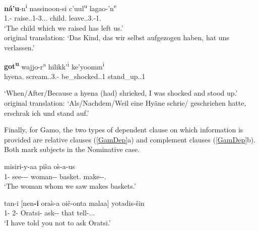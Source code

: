 \begin{exe}\ex\label{KabDep}
\begin{xlist}
\ex\gll \textbf{n\'a'u}-n\textsuperscript{i} nassinoon-si c'uul\textsuperscript{u} lagao-'n\textsuperscript{e}\\
1\pl{}.\nom{}-\emphat{} raise.\pfv{}.1\pl{}-3\sg{}.\mas{}.\obj{}.\relativ{} child.\nom{} leave.\pfv{}.3\sg{}.\mas{}-1\pl{}.\obj{}\\
\glt `The child which we raised has left us.'\\
\glt original translation: `Das Kind, das wir selbst aufgezogen haben, hat uns verlassen.' %

\ex\gll \textbf{got\textsuperscript{u}} wajjo-r\textsuperscript{a} hilikk'\textsuperscript{i} ke'yoomm\textsuperscript{i}\\
hyena.\nom{} scream.\pfv{}.3\sg{}.\mas{}-\tmp{} be\_shocked.\cvb{}.1\sg{} stand\_up.\pfv{}.1\sg{}\\
\begin{sloppypar}\glt  `When/After/Because a hyena (had) shrieked, I was shocked and stood up.' %
\\
\glt original translation: `Als/Nachdem/Weil eine Hy\"{a}ne schrie/ ge\-schrie\-hen hatte, erschrak ich und stand auf.' \end{sloppypar} %
\end{xlist}
\end{exe}

Finally, for Gamo, the two types of dependent clause on which information is provided are relative clauses (\ref{GamDep}a) and complement clauses (\ref{GamDep}b). 
Both mark subjects in the Nominative  case.

\pagebreak
\begin{exe}\ex\label{GamDep}
\begin{xlist}
\ex{} misiri-y-aa pi\`sa o\`s-a-us\\
1\pl{}-\nom{} see-\persm-\tns{}-\complx{} woman--\nom{} basket.\acc{} make-\persm-\tns{}.\complx{}\\
\glt `The woman whom we saw makes baskets.'

\ex\gll tan-i [nen\textbf{-i} ora\`s-a oi\v c-onta malaa] yotadis-\v sin\\
1\sg{}-\nom{} 2\sg{}-\nom{} Oratsi-\acc{} ask-\Neg{}-\Inf{} that tell-\persm.\tns{}.\complx{}.\aux{}\\
\glt `I have told you not to ask Oratsi.'
\end{xlist}
\end{exe}


